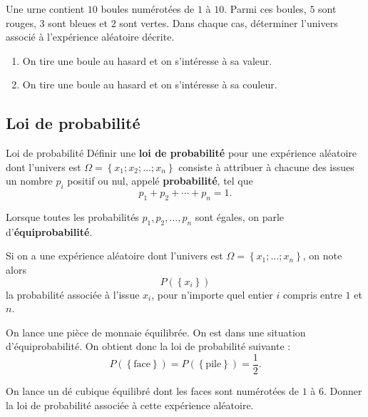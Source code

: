 \documentclass[11pt]{article}
\begin{document}
\begin{app}
  Une urne contient $10$ boules numérotées de $1$ à $10$. Parmi ces boules, $5$
  sont rouges, $3$ sont bleues et $2$ sont vertes. Dans chaque cas, déterminer
  l'univers associé à l'expérience aléatoire décrite.
  \begin{enumerate}
    \item On tire une boule au hasard et on s'intéresse à sa valeur.
    \item On tire une boule au hasard et on s'intéresse à sa couleur.
  \end{enumerate}
\end{app}

\subsection{Loi de probabilité}

\begin{defi}{Loi de probabilité}
  Définir une \textbf{loi de probabilité} pour une expérience aléatoire dont
  l'univers est $\Omega=\left\{ x_1; x_2; \dots; x_n \right\}$ consiste à
  attribuer à chacune des issues un nombre $p_i$ positif ou nul, appelé
  \textbf{probabilité}, tel que
  \[
    p_1+p_2+\cdots+p_n = 1.
  \]
\end{defi}
\begin{rmq}
  Lorsque toutes les probabilités $p_1, p_2, \dots, p_n$ sont égales, on parle
  d'\textbf{équiprobabilité}.
\end{rmq}
\begin{notation}
  Si on a une expérience aléatoire dont l'univers est $\Omega=\left\{ x_1;
    \dots; x_n \right\}$, on note alors
    \[
      P\left( \left\{ x_i \right\} \right)
    \]
    la probabilité associée à l'issue $x_i$, pour n'importe quel entier $i$
    compris entre $1$ et $n$.
\end{notation}
\begin{exemple}
  On lance une pièce de monnaie équilibrée. On est dans une situation
  d'équiprobabilité. On obtient donc la loi de probabilité suivante :
  \[
    P\left( \left\{ \text{face} \right\} \right)=P\left( \left\{ \text{pile}
  \right\} \right)=\frac{1}{2}.
  \]
\end{exemple}

\begin{app}
  On lance un dé cubique équilibré dont les faces sont numérotées de $1$ à $6$.
  Donner la loi de probabilité associée à cette expérience aléatoire.
\end{app}
\end{document}
